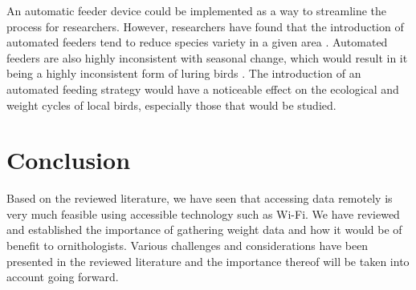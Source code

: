\documentclass[class=report,11pt,crop=false]{standalone}
\begin{document}
An automatic feeder device could be implemented as a way to streamline the process for researchers. However, researchers have found that the introduction of automated feeders tend to reduce species variety in a given area \cite{GalbraithFeeders}. Automated feeders are also highly inconsistent with seasonal change, which would result in it being a highly inconsistent form of luring birds \cite{GalbraithFeeders}. The introduction of an automated feeding strategy would have a noticeable effect on the ecological and weight cycles of local birds, especially those that would be studied.

\section{Conclusion}

Based on the reviewed literature, we have seen that accessing data remotely is very much feasible using accessible technology such as Wi-Fi. We have reviewed and established the importance of gathering weight data and how it would be of benefit to ornithologists. Various challenges and considerations have been presented in the reviewed literature and the importance thereof will be taken into account going forward. 

\ifstandalone

\printnoidxglossary[type=\acronymtype,nonumberlist]
\fi
\end{document}
